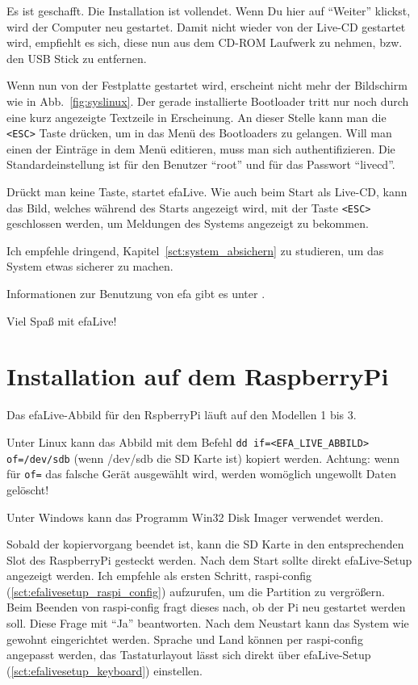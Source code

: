 \documentclass[a4paper,12pt,twoside]{article}
\begin{document}
Es ist geschafft. Die Installation ist vollendet. Wenn Du hier auf
"`Weiter"' klickst, wird der Computer neu
gestartet. Damit nicht wieder von der Live-CD gestartet wird, empfiehlt
es sich, diese nun aus dem CD-ROM Laufwerk zu nehmen, bzw. den USB
Stick zu entfernen.

Wenn nun von der Festplatte gestartet wird, erscheint nicht mehr der
Bildschirm wie in Abb.~\ref{fig:syslinux}. Der gerade installierte
Bootloader tritt nur noch durch eine kurz angezeigte Textzeile in
Erscheinung. An dieser Stelle kann man die \texttt{{\textless}ESC{\textgreater}}
Taste drücken, um in das Menü des Bootloaders zu gelangen. Will man
einen der Einträge in dem Menü editieren, muss man sich
authentifizieren. Die Standardeinstellung ist für den Benutzer
"`root"' und für das Passwort "`livecd"'. 

Drückt man keine Taste, startet efaLive. Wie auch beim Start als
Live-CD, kann das Bild, welches während des Starts angezeigt wird, mit
der Taste \texttt{{\textless}ESC{\textgreater}} geschlossen werden, um Meldungen
des Systems angezeigt zu bekommen.

Ich empfehle dringend, Kapitel~\ref{sct:system_absichern} zu studieren, um das System etwas
sicherer zu machen.

\bigskip
Informationen zur Benutzung von efa gibt es unter \cite{EFA2}.

\bigskip
Viel Spaß mit efaLive!


\section{Installation auf dem RaspberryPi}
\label{sct:instalation_raspberry}
Das efaLive-Abbild für den RspberryPi läuft auf den Modellen 1 bis 3.

Unter Linux kann das Abbild mit dem Befehl \texttt{dd if={\textless}EFA\_LIVE\_ABBILD{\textgreater} 
of=/dev/sdb} (wenn /dev/sdb die SD Karte ist) kopiert werden. Achtung: 
wenn für \texttt{of=} das falsche Gerät ausgewählt wird, werden womöglich 
ungewollt Daten gelöscht!

Unter Windows kann das Programm Win32 Disk Imager \cite{IMG1} verwendet
werden. 

Sobald der kopiervorgang beendet ist, kann die SD Karte in den entsprechenden Slot
des RaspberryPi gesteckt werden. Nach dem Start sollte direkt efaLive-Setup angezeigt 
werden. Ich empfehle als ersten Schritt, raspi-config (\ref{sct:efalivesetup_raspi_config}) 
aufzurufen, um die Partition
zu vergrößern. Beim Beenden von raspi-config fragt dieses nach, ob der Pi neu 
gestartet werden soll. Diese Frage mit "`Ja"' beantworten. Nach dem Neustart kann
das System wie gewohnt eingerichtet werden. Sprache und Land können per raspi-config 
angepasst werden, das Tastaturlayout lässt sich direkt über efaLive-Setup 
(\ref{sct:efalivesetup_keyboard}) einstellen.
\end{document}
